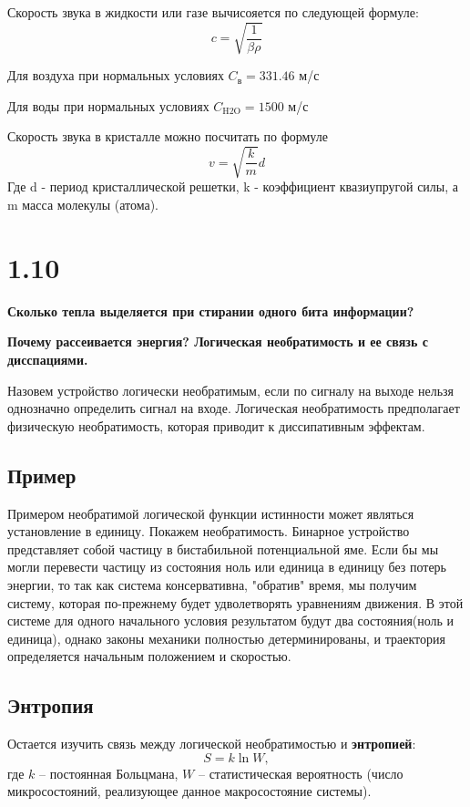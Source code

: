 \documentclass[a4paper,14pt]{article}
\begin{document}
Скорость звука в жидкости или газе вычисояется по следующей формуле:
$$c = \sqrt{\frac{1}{\beta \rho}}$$

Для воздуха при нормальных условиях
$C_{\text{в}} = 331.46$ м/с

Для воды при нормальных условиях
$C_{\text{H2O}} = 1500$ м/с

Скорость звука в кристалле можно посчитать по формуле 
$$v=\sqrt{\frac{k}{m}}d$$
Где d - период кристаллической решетки, k - коэффициент квазиупругой силы, а m масса молекулы (атома).

\section*{1.10}

\begin{center}
	\LARGE{\textbf{Сколько тепла выделяется при стирании одного бита информации?}}\\
\end{center}

\textbf{Почему рассеивается энергия? Логическая необратимость и ее связь с дисспациями.}
 
Назовем устройство логически необратимым, если по сигналу на выходе нельзя однозначно определить сигнал на входе. Логическая необратимость предполагает физическую необратимость, которая приводит к диссипативным эффектам.

\subsection*{Пример}
Примером необратимой логической функции истинности может являться установление в единицу.
Покажем необратимость. Бинарное устройство представляет собой частицу в бистабильной потенциальной яме. Если бы мы могли перевести частицу из состояния ноль или единица в единицу без потерь энергии, то так как система консервативна, "обратив" время, мы получим систему, которая по-прежнему будет удволетворять уравнениям движения. В этой системе для одного начального условия результатом будут два состояния(ноль и единица), однако законы механики полностью детерминированы, и траектория определяется начальным положением и скоростью.

\subsection*{Энтропия}

Остается изучить связь между логической необратимостью и \textbf{энтропией}:
\begin{equation}
	S = k \ln W,
\end{equation}
где $k$ -- постоянная Больцмана, $W$ -- статистическая вероятность (число микросостояний, реализующее данное макросостояние системы).
\end{document}
